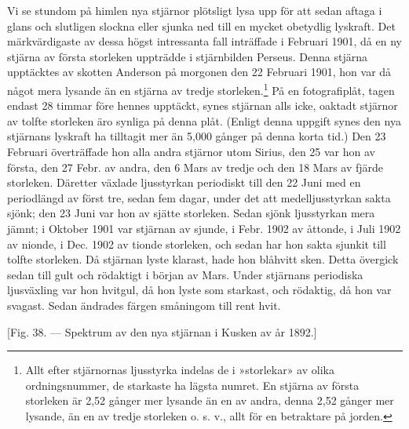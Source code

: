 \documentclass[a4paper, 12pt, oneside, swedish]{article}
\begin{document}
Vi se stundom på himlen nya stjärnor plötsligt lysa upp för att sedan aftaga i glans och slutligen slockna eller sjunka ned till en mycket obetydlig lyskraft. Det märkvärdigaste av dessa högst intressanta fall inträffade i Februari 1901, då en ny stjärna av första storleken uppträdde i stjärnbilden Perseus. Denna stjärna upptäcktes av skotten Anderson på morgonen den 22 Februari 1901, hon var då något mera lysande än en stjärna av tredje storleken.\footnote{Allt efter stjärnornas ljusstyrka indelas de i »storlekar» av olika ordningsnummer, de starkaste ha lägsta numret. En stjärna av första storleken är 2,52 gånger mer lysande än en av andra, denna 2,52 gånger mer lysande, än en av tredje storleken o. s. v., allt för en betraktare på jorden.} På en fotografiplåt, tagen endast 28 timmar före hennes upptäckt, synes stjärnan alls icke, oaktadt stjärnor av tolfte storleken äro synliga på denna plåt. (Enligt denna uppgift synes den nya stjärnans lyskraft ha tilltagit mer än 5,000 gånger på denna korta tid.) Den 23 Februari överträffade hon alla andra stjärnor utom Sirius, den 25 var hon av första, den 27 Febr. av andra, den 6 Mars av tredje och den 18 Mars av fjärde storleken. Däretter växlade ljusstyrkan periodiskt till den 22 Juni med en periodlängd av först tre, sedan fem dagar, under det att medelljusstyrkan sakta sjönk; den 23 Juni var hon av sjätte storleken. Sedan sjönk ljusstyrkan mera jämnt; i Oktober 1901 var stjärnan av sjunde, i Febr. 1902 av åttonde, i Juli 1902 av nionde, i Dec. 1902 av tionde storleken, och sedan har hon sakta sjunkit till tolfte storleken. Då stjärnan lyste klarast, hade hon blåhvitt sken. Detta övergick sedan till gult och rödaktigt i början av Mars. Under stjärnans periodiska ljusväxling var hon hvitgul, då hon lyste som starkast, och rödaktig, då hon var svagast. Sedan ändrades färgen småningom till rent hvit.

[Fig. 38. --- Spektrum av den nya stjärnan i Kusken av år 1892.]
\end{document}
